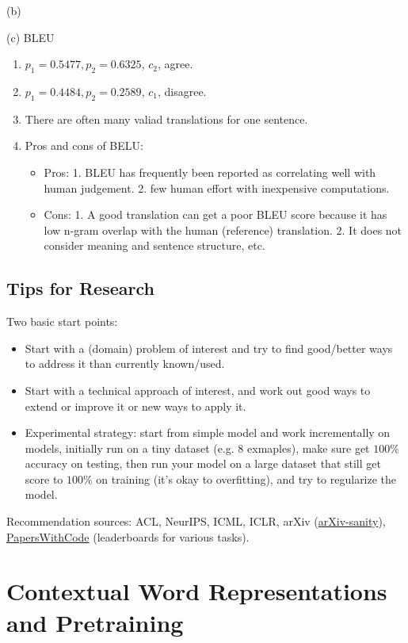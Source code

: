 (b)


(c) BLEU
\begin{enumerate}[label=(\roman*)]
	\item $p_1 = 0.5477, p_2 = 0.6325$, $c_2$, agree.
	\item $p_1 = 0.4484, p_2 = 0.2589$, $c_1$, disagree.
	\item There are often many valiad translations for one sentence.
	\item Pros and cons of BELU:
	\begin{itemize}
		\item Pros: 1. BLEU has frequently been reported as correlating well with human judgement. 2. few human effort with inexpensive computations.
		\item Cons: 1. A good translation can get a poor BLEU score because it has low n-gram overlap with the human (reference) translation. 2. It does not consider meaning and sentence structure, etc.
	\end{itemize}
\end{enumerate}

\subsection{Tips for Research}
Two basic start points:
\begin{itemize}
	\item Start with a (domain) problem of interest and try to find good/better ways to address it than currently known/used.
	\item Start with a technical approach of interest, and work out good ways to extend or improve it or new ways to apply it.
	\item Experimental strategy: start from simple model and work incrementally on models, initially run on a tiny dataset (e.g. $8$ exmaples), make sure get $100\%$ accuracy on testing, then run your model on a large dataset that still get score to $100\%$ on training (it's okay to overfitting), and try to regularize the model.
\end{itemize}

Recommendation sources: ACL, NeurIPS, ICML, ICLR, arXiv (\href{http://www.arxiv-sanity.com/}{arXiv-sanity}), \href{https://paperswithcode.com/}{PapersWithCode} (leaderboards for various tasks).

\section{Contextual Word Representations and Pretraining} \label{contextual_word_rep}

